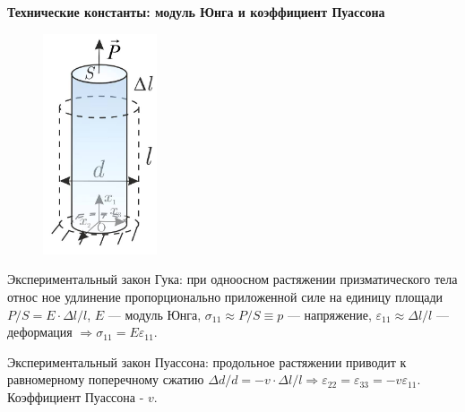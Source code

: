 \textbf{Технические константы: модуль Юнга и коэффициент Пуассона}

\begin{figure}[h!]
  \centering
  \includegraphics[width=0.3\textwidth]{images/12.2.jpg}
\end{figure}



Экспериментальный закон Гука: при одноосном растяжении призматического тела относ ное удлинение пропорционально приложенной силе на единицу площади $P / S=E \cdot \Delta l / l$, $E$ --- модуль Юнга, $\sigma_{11} \approx P / S \equiv p$ --- напряжение, $\varepsilon_{11} \approx \Delta l / l$ --- деформация $\Rightarrow \sigma_{11}=E \varepsilon_{11}$. 

Экспериментальный закон Пуассона: продольное растяжении приводит к равномерному поперечному сжатию $\Delta d / d=-v \cdot \Delta l / l \Rightarrow \varepsilon_{22}=\varepsilon_{33}=-v \varepsilon_{11}.$ Коэффициент Пуассона - $v$. 
 

